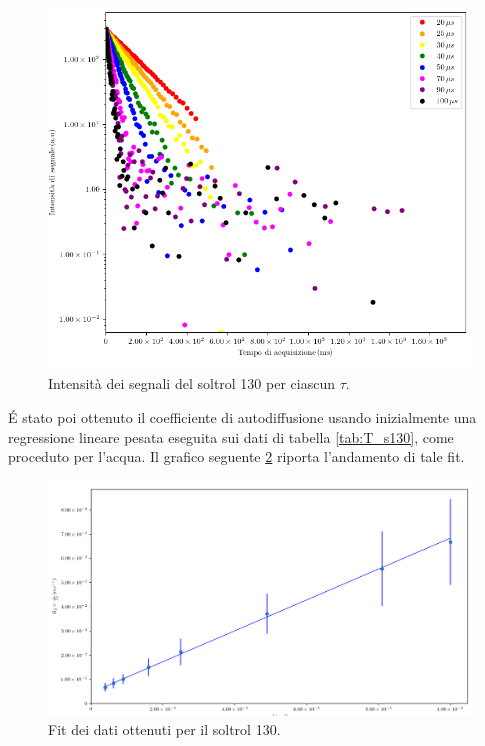 \begin{figure}[ht]
\centering
\includegraphics[width=\columnwidth]{Figure/SOLTROL130_SigTSig.png}
\caption{Intensità dei segnali del soltrol 130 per ciascun $\tau$.}
\label{fig:S_s130}
\end{figure}

\'E stato poi ottenuto il coefficiente di autodiffusione usando inizialmente una regressione lineare pesata eseguita sui dati di tabella \ref{tab:T_s130}, come proceduto per l'acqua.
Il grafico seguente \ref{fig:Df_s130} riporta l'andamento di tale fit.

\begin{figure}[ht]
\centering
\includegraphics[width=\columnwidth]{Figure/SOLTROL130_calc.png}
\caption{Fit dei dati ottenuti per il soltrol 130.}
\label{fig:Df_s130}
\end{figure}

